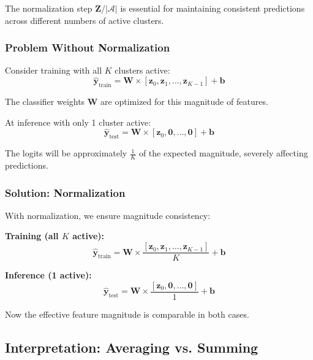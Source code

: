 \documentclass[11pt,a4paper]{article}
\begin{document}
The normalization step $\mathbf{Z} / |\mathcal{A}|$ is essential for maintaining consistent predictions across different numbers of active clusters.

\subsubsection{Problem Without Normalization}

Consider training with all $K$ clusters active:
\begin{equation}
\hat{\mathbf{y}}_{\text{train}} = \mathbf{W} \times \left[\mathbf{z}_0, \mathbf{z}_1, \ldots, \mathbf{z}_{K-1}\right] + \mathbf{b}
\end{equation}

The classifier weights $\mathbf{W}$ are optimized for this magnitude of features.

At inference with only 1 cluster active:
\begin{equation}
\hat{\mathbf{y}}_{\text{test}} = \mathbf{W} \times \left[\mathbf{z}_0, \mathbf{0}, \ldots, \mathbf{0}\right] + \mathbf{b}
\end{equation}

The logits will be approximately $\frac{1}{K}$ of the expected magnitude, severely affecting predictions.

\subsubsection{Solution: Normalization}

With normalization, we ensure magnitude consistency:

\textbf{Training (all $K$ active):}
\begin{equation}
\hat{\mathbf{y}}_{\text{train}} = \mathbf{W} \times \frac{\left[\mathbf{z}_0, \mathbf{z}_1, \ldots, \mathbf{z}_{K-1}\right]}{K} + \mathbf{b}
\end{equation}

\textbf{Inference (1 active):}
\begin{equation}
\hat{\mathbf{y}}_{\text{test}} = \mathbf{W} \times \frac{\left[\mathbf{z}_0, \mathbf{0}, \ldots, \mathbf{0}\right]}{1} + \mathbf{b}
\end{equation}

Now the effective feature magnitude is comparable in both cases.

\subsection{Interpretation: Averaging vs. Summing}
\end{document}
